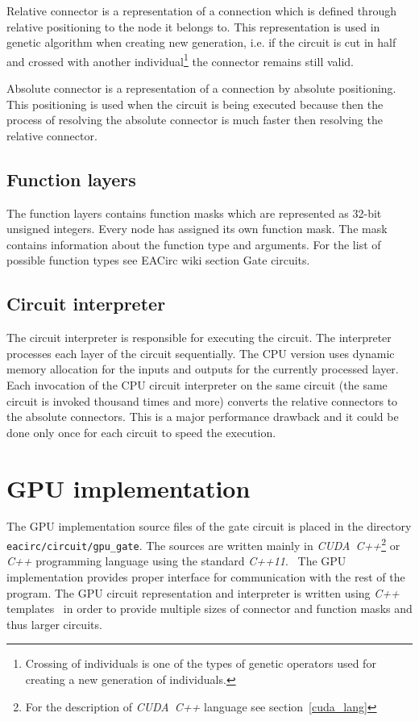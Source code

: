 \documentclass[12pt,oneside]{fithesis2}
\begin{document}
Relative connector is a representation of a connection which is defined through relative positioning to the node it belongs to. This representation is used in genetic algorithm when creating new generation, i.e. if the circuit is cut in half and crossed with another individual\footnote{Crossing of individuals is one of the types of genetic operators used for creating a new generation of individuals.} the connector remains still valid.

Absolute connector is a representation of a connection by absolute positioning. This positioning is used when the circuit is being executed because then the process of resolving the absolute connector is much faster then resolving the relative connector.

\subsection{Function layers}

The function layers contains function masks which are represented as 32-bit unsigned integers. Every node has assigned its own function mask. The mask contains information about the function type and arguments. For the list of possible function types see EACirc wiki section Gate circuits.~\cite{eacirc_circuit}

\subsection{Circuit interpreter}

The circuit interpreter is responsible for executing the circuit. The interpreter processes each layer of the circuit sequentially. The CPU version uses dynamic memory allocation for the inputs and outputs for the currently processed layer. Each invocation of the CPU circuit interpreter on the same circuit (the same circuit is invoked thousand times and more) converts the relative connectors to the absolute connectors. This is a major performance drawback and it could be done only once for each circuit to speed the execution.


\section{GPU implementation}

The GPU implementation source files of the gate circuit is placed in the directory \texttt{eacirc/circuit/gpu\_gate}. The sources are written mainly in \emph{CUDA~C++}\footnote{For the description of \emph{CUDA~C++} language see section~\ref{cuda_lang}} or \emph{C++} programming language using the standard \emph{C++11}.~\cite{std_c++11, cuda_guide} The GPU implementation provides proper interface for communication with the rest of the program. The GPU circuit representation and interpreter is written using \emph{C++} templates~\cite{std_c++11} in order to provide multiple sizes of connector and function masks and thus larger circuits.
\end{document}
